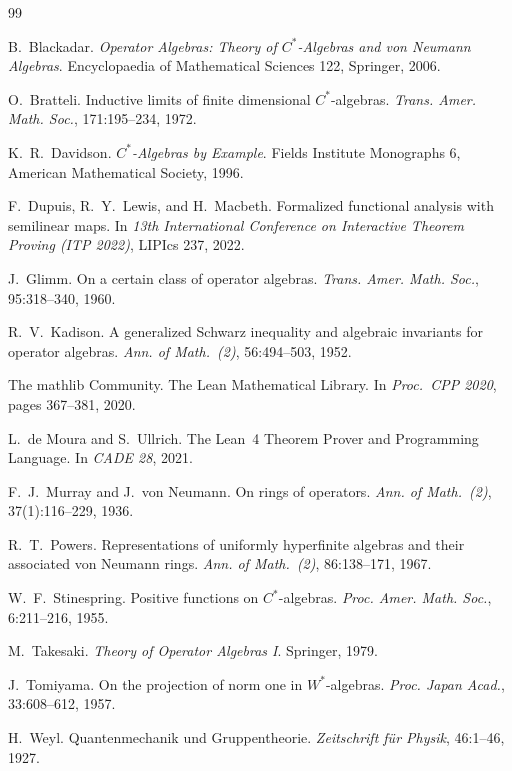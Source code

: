 \documentclass[11pt,reqno]{amsart}
\theoremstyle{plain}
\theoremstyle{definition}
\theoremstyle{remark}
\begin{document}
\begin{thebibliography}{99}

B.~Blackadar.
\newblock \emph{Operator Algebras: Theory of $C^*$-Algebras and von Neumann Algebras}.
\newblock Encyclopaedia of Mathematical Sciences 122, Springer, 2006.

O.~Bratteli.
\newblock Inductive limits of finite dimensional $C^*$-algebras.
\newblock \emph{Trans. Amer. Math. Soc.}, 171:195--234, 1972.

K.~R.~Davidson.
\newblock \emph{$C^*$-Algebras by Example}.
\newblock Fields Institute Monographs 6, American Mathematical Society, 1996.

F.~Dupuis, R.~Y.~Lewis, and H.~Macbeth.
\newblock Formalized functional analysis with semilinear maps.
\newblock In \emph{13th International Conference on Interactive Theorem Proving (ITP 2022)}, LIPIcs 237, 2022.

J.~Glimm.
\newblock On a certain class of operator algebras.
\newblock \emph{Trans. Amer. Math. Soc.}, 95:318--340, 1960.

R.~V.~Kadison.
\newblock A generalized Schwarz inequality and algebraic invariants for operator algebras.
\newblock \emph{Ann. of Math.~(2)}, 56:494--503, 1952.

The mathlib Community.
\newblock The Lean Mathematical Library.
\newblock In \emph{Proc.\ CPP 2020}, pages 367--381, 2020.

L.~de Moura and S.~Ullrich.
\newblock The Lean~4 Theorem Prover and Programming Language.
\newblock In \emph{CADE 28}, 2021.

F.~J.~Murray and J.~von Neumann.
\newblock On rings of operators.
\newblock \emph{Ann. of Math.~(2)}, 37(1):116--229, 1936.

R.~T.~Powers.
\newblock Representations of uniformly hyperfinite algebras and their associated von Neumann rings.
\newblock \emph{Ann. of Math.~(2)}, 86:138--171, 1967.

W.~F.~Stinespring.
\newblock Positive functions on $C^*$-algebras.
\newblock \emph{Proc. Amer. Math. Soc.}, 6:211--216, 1955.

M.~Takesaki.
\newblock \emph{Theory of Operator Algebras I}.
\newblock Springer, 1979.

J.~Tomiyama.
\newblock On the projection of norm one in $W^*$-algebras.
\newblock \emph{Proc. Japan Acad.}, 33:608--612, 1957.

H.~Weyl.
\newblock Quantenmechanik und Gruppentheorie.
\newblock \emph{Zeitschrift f\"ur Physik}, 46:1--46, 1927.

\end{thebibliography}
\end{document}
